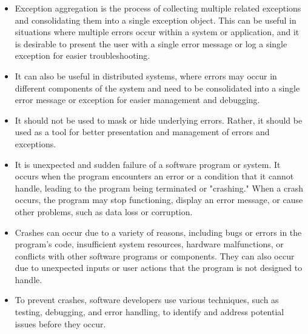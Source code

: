 
\STANDARD{}
{ 
	
	\begin{itemize}
		\item Exception aggregation is the process of collecting multiple related exceptions and consolidating them into a single exception object. This can be useful in situations where multiple errors occur within a system or application, and it is desirable to present the user with a single error message or log a single exception for easier troubleshooting.\\ 
		
		\item It can also be useful in distributed systems, where errors may occur in different components of the system and need to be consolidated into a single error message or exception for easier management and debugging.\\ 
		
		\item It should not be used to mask or hide underlying errors. Rather, it should be used as a tool for better presentation and management of errors and exceptions.\\
	\end{itemize}
}


\STANDARD{}
{
	\begin{itemize}
		\item It is unexpected and sudden failure of a software program or system. It occurs when the program encounters an error or a condition that it cannot handle, leading to the program being terminated or "crashing." When a crash occurs, the program may stop functioning, display an error message, or cause other problems, such as data loss or corruption.\\ 
		
		\item Crashes can occur due to a variety of reasons, including bugs or errors in the program's code, insufficient system resources, hardware malfunctions, or conflicts with other software programs or components. They can also occur due to unexpected inputs or user actions that the program is not designed to handle.\\ 
		
		\item To prevent crashes, software developers use various techniques, such as testing, debugging, and error handling, to identify and address potential issues before they occur.\\
	\end{itemize}
}

